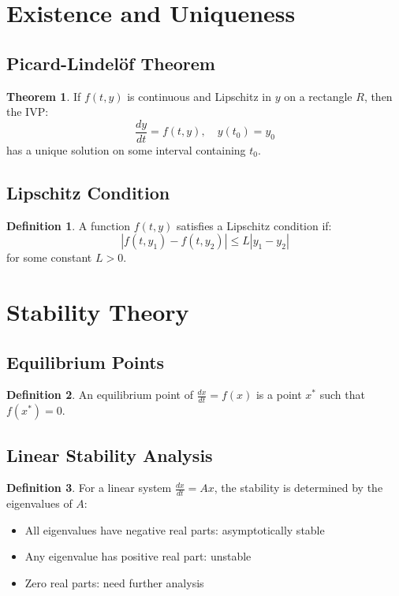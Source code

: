 \documentclass[11pt]{article}
\theoremstyle{definition}
\newtheorem{definition}{Definition}[section]
\newtheorem{theorem}{Theorem}[section]
\begin{document}
\section{Existence and Uniqueness}

\subsection{Picard-Lindelöf Theorem}
\begin{theorem}
If $f(t,y)$ is continuous and Lipschitz in $y$ on a rectangle $R$, then the IVP:
$$\frac{dy}{dt} = f(t,y), \quad y(t_0) = y_0$$
has a unique solution on some interval containing $t_0$.
\end{theorem}

\subsection{Lipschitz Condition}
\begin{definition}
A function $f(t,y)$ satisfies a Lipschitz condition if:
$$|f(t,y_1) - f(t,y_2)| \leq L|y_1 - y_2|$$
for some constant $L > 0$.
\end{definition}

\section{Stability Theory}

\subsection{Equilibrium Points}
\begin{definition}
An equilibrium point of $\frac{dx}{dt} = f(x)$ is a point $x^*$ such that $f(x^*) = 0$.
\end{definition}

\subsection{Linear Stability Analysis}
\begin{definition}
For a linear system $\frac{dx}{dt} = Ax$, the stability is determined by the eigenvalues of $A$:
\begin{itemize}
    \item All eigenvalues have negative real parts: asymptotically stable
    \item Any eigenvalue has positive real part: unstable
    \item Zero real parts: need further analysis
\end{itemize}
\end{definition}
\end{document}
